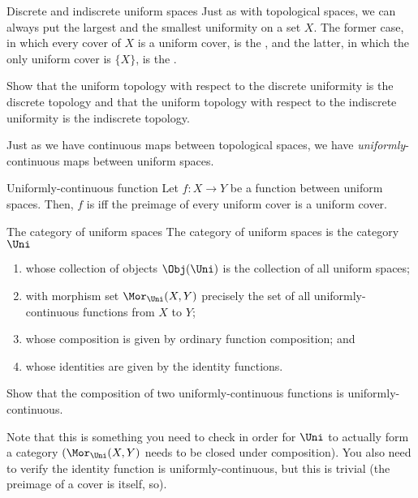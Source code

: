 \begin{exm}{Discrete and indiscrete uniform spaces}{}
Just as with topological spaces, we can always put the largest and the smallest uniformity on a set $X$.  The former case, in which every cover of $X$ is a uniform cover, is the , and the latter, in which the only uniform cover is $\{ X\}$, is the .
\begin{exr}[breakable=false]{}{}
Show that the uniform topology with respect to the discrete uniformity is the discrete topology and that the uniform topology with respect to the indiscrete uniformity is the indiscrete topology.
\end{exr}
\end{exm}

Just as we have continuous maps between topological spaces, we have \emph{uniformly}-continuous maps between uniform spaces.
\begin{dfn}{Uniformly-continuous function}{}
Let $f\colon X\rightarrow Y$ be a function between uniform spaces.  Then, $f$ is  iff the preimage of every uniform cover is a uniform cover.
\end{dfn}
\begin{exm}{The category of uniform spaces}{}
The category of uniform spaces is the category $\Uni$\index[notation]{$\Uni$}
\begin{enumerate}
\item whose collection of objects $\Obj (\Uni )$ is the collection of all uniform spaces;
\item with morphism set $\Mor _{\Uni}(X,Y)$ precisely the set of all uniformly-continuous functions from $X$ to $Y$;
\item whose composition is given by ordinary function composition; and
\item whose identities are given by the identity functions.
\end{enumerate}
\begin{exr}[breakable=false]{}{}
Show that the composition of two uniformly-continuous functions is uniformly-continuous.
\begin{rmk}
Note that this is something you need to check in order for $\Uni$ to actually form a category $(\Mor _{\Uni}(X,Y)$ needs to be closed under composition).  You also need to verify the identity function is uniformly-continuous, but this is trivial (the preimage of a cover is itself, so\textellipsis ).
\end{rmk}
\end{exr}
\end{exm}
